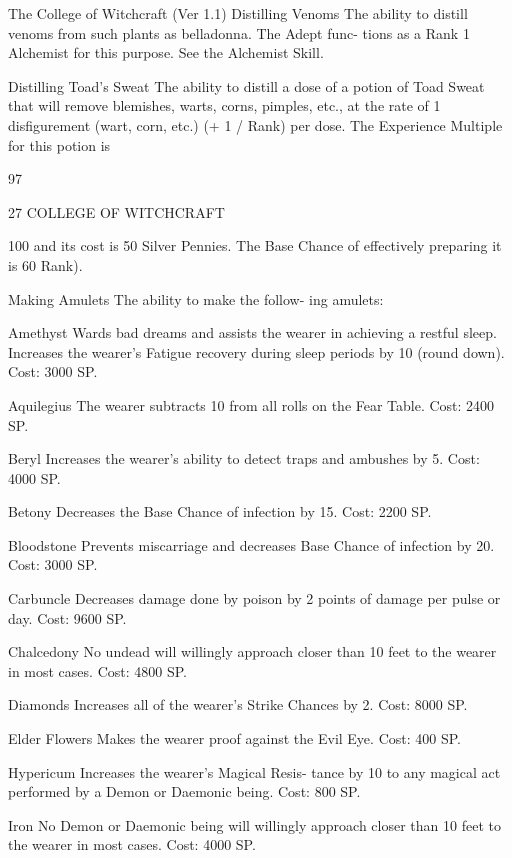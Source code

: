 \begin{Chapter}{The College of Witchcraft (Ver 1.1)}
Distilling  Venoms  The  ability  to  distill  venoms 
from  such  plants  as  belladonna.  The  Adept  func-
tions  as  a  Rank  1  Alchemist  for  this  purpose.  See 
the Alchemist Skill. 

Distilling  Toad’s  Sweat  The  ability  to  distill  a 
dose  of  a  potion  of  Toad  Sweat  that  will  remove 
blemishes, warts, corns, pimples, etc., at the rate of 
1  disfigurement  (wart,  corn,  etc.)  (+ 1  / Rank)  per 
dose.  The  Experience  Multiple  for  this  potion  is 

97 

27 COLLEGE OF WITCHCRAFT 

100  and  its  cost  is  50  Silver  Pennies.  The  Base 
Chance  of  effectively  preparing  it  is  60%
Rank). 

Making  Amulets  The  ability  to  make  the  follow-
ing amulets: 

Amethyst Wards bad dreams and assists the wearer 
in achieving a restful sleep.  Increases the wearer’s 
Fatigue  recovery  during  sleep  periods  by  10%
(round down). Cost: 3000 SP. 

Aquilegius  The  wearer  subtracts  10  from  all  rolls 
on the Fear Table. Cost: 2400 SP. 

Beryl  Increases  the  wearer’s  ability  to  detect  traps 
and ambushes by 5. Cost: 4000 SP. 

Betony Decreases the Base Chance of infection by 
15. Cost: 2200 SP. 

Bloodstone  Prevents  miscarriage  and  decreases 
Base Chance of infection by 20. Cost: 3000 SP. 

Carbuncle Decreases damage done by poison by 2 
points of damage per pulse or day. Cost: 9600 SP. 

Chalcedony  No  undead  will  willingly  approach 
closer  than  10  feet  to  the  wearer  in  most  cases. 
Cost: 4800 SP. 

Diamonds  Increases  all  of  the  wearer’s  Strike 
Chances by 2. Cost: 8000 SP. 

Elder Flowers Makes the wearer proof against the 
Evil Eye. Cost: 400 SP. 

Hypericum  Increases  the  wearer’s  Magical  Resis-
tance  by  10  to  any  magical  act  performed  by  a 
Demon or Daemonic being. Cost: 800 SP. 

Iron  No  Demon  or  Daemonic  being will  willingly 
approach closer than 10 feet to the wearer in most 
cases. Cost: 4000 SP. 


\end{Chapter}
